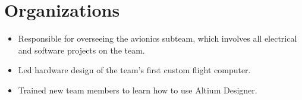 \documentclass[]{deedy-resume-openfont}
\begin{document}
\begin{minipage}[t]{0.66\textwidth}
\sectionsep






\section{Organizations}

\begin{itemize}
    \item Responsible for overseeing the avionics subteam, which involves all electrical and software projects on the team.
    \item Led hardware design of the team's first custom flight computer.
    \item Trained new team members to learn how to use Altium Designer.
\end{itemize}



\end{minipage}
\end{document}
